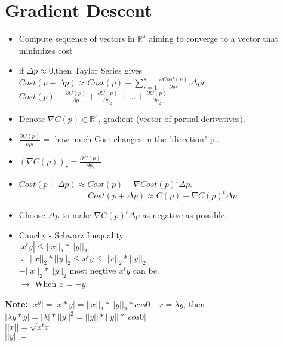 \section{Gradient Descent}
\begin{itemize}
  \item Compute sequence of vectors in $\mathbb{R}^s$ aiming to converge to a vector that minimizes cost
  \item if $\Delta p \approx0$,then Taylor Series gives $Cost(p+\Delta p) \approx Cost(p)+ \sum_{r=1}^{s} \frac{\partial Cost(p)}{\partial pr}$.$\Delta pr$. $Cost(p)+ \frac{\partial C(p)}{\partial p} +\frac{\partial C(p)}{\partial p_2}+...+\frac{\partial C(p)}{\partial p_2}$
  \item Denote $\nabla C(p) \in \mathbb{R}^s$, gradient (vector of partial derivatives). 
  \item $\frac{\partial C(p)}{\partial pi} =$ how much Cost changes in the "direction" pi.
  \item $(\nabla C(p))_r = \frac{\partial C(p)}{\partial p_r}$
  \item $Cost (p+\Delta p) \approx Cost(p)+ \nabla Cost(p)^t\Delta p $. \\
\[
\boxed{Cost (p + \Delta p) \approx C(p) + \nabla C(p)^t \Delta p}
\]
  \item Choose $\Delta p $ to make $ \nabla C(p)^t\Delta p$ as negative as possible.
  \item Cauchy - Schwarz Inequality. \\
  $|x^ty| \leq||x||_2*||y||_2$\\
  $\therefore -||x||_2*||y||_2  \leq x^ty \leq||x||_2*||y||_2$\\
  $-||x||_2*||y||_2$ most negtive $x^ty$ can be.\\
  $\rightarrow$ When $x=-y$.
\end{itemize}
\textbf{Note:} $|x^y|=|x*y|=||x||_2*||y||_2*cos0 \quad x= \lambda y$, then $|\lambda y*y|=|\lambda|*||y||^2=||y||*||y||*|cos0|$\\
$||x||=\sqrt{x^tx}$\\
$||y|| = $
